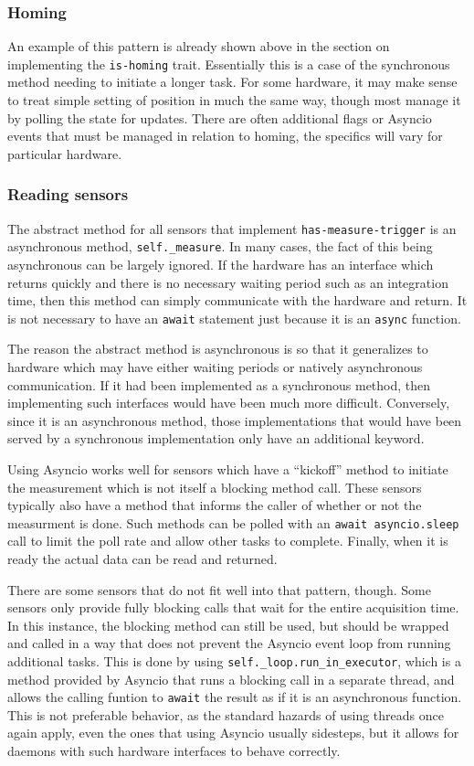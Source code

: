 \subsubsection{Homing}

An example of this pattern is already shown above in the section on implementing the \texttt{is-homing} trait.
Essentially this is a case of the synchronous method needing to initiate a longer task.
For some hardware, it may make sense to treat simple setting of position in much the same way, though most manage it by polling the state for updates.
There are often additional flags or Asyncio events that must be managed in relation to homing, the specifics will vary for particular hardware.

\subsubsection{Reading sensors}

The abstract method for all sensors that implement \texttt{has-measure-trigger} is an asynchronous method, \texttt{self.\_measure}.
In many cases, the fact of this being asynchronous can be largely ignored.
If the hardware has an interface which returns quickly and there is no necessary waiting period such as an integration time, then this method can simply communicate with the hardware and return.
It is not necessary to have an \texttt{await} statement just because it is an \texttt{async} function.

The reason the abstract method is asynchronous is so that it generalizes to hardware which may have either waiting periods or natively asynchronous communication.
If it had been implemented as a synchronous method, then implementing such interfaces would have been much more difficult.
Conversely, since it is an asynchronous method, those implementations that would have been served by a synchronous implementation only have an additional keyword.

Using Asyncio works well for sensors which have a ``kickoff'' method to initiate the measurement which is not itself a blocking method call.
These sensors typically also have a method that informs the caller of whether or not the measurment is done.
Such methods can be polled with an \texttt{await asyncio.sleep} call to limit the poll rate and allow other tasks to complete.
Finally, when it is ready the actual data can be read and returned.

There are some sensors that do not fit well into that pattern, though.
Some sensors only provide fully blocking calls that wait for the entire acquisition time.
In this instance, the blocking method can still be used, but should be wrapped and called in a way that does not prevent the Asyncio event loop from running additional tasks.
This is done by using \texttt{self.\_loop.run\_in\_executor}, which is a method provided by Asyncio that runs a blocking call in a separate thread, and allows the calling funtion to \texttt{await} the result as if it is an asynchronous function.
This is not preferable behavior, as the standard hazards of using threads once again apply, even the ones that using Asyncio usually sidesteps, but it allows for daemons with such hardware interfaces to behave correctly.

